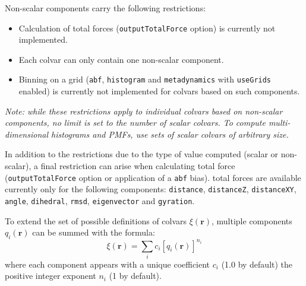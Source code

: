Non-scalar components carry the following restrictions:
\begin{itemize}
\item Calculation of total forces (\texttt{outputTotalForce} option)
  is currently not implemented.
\item Each colvar can only contain one non-scalar component.
\item Binning on a grid (\texttt{abf}, \texttt{histogram} and
  \texttt{metadynamics} with \texttt{useGrids} enabled) is currently
  not implemented for colvars based on such components.
\end{itemize}

\emph{Note: while these restrictions apply to individual colvars based
  on non-scalar components, no limit is set to the number of scalar
  colvars.  To compute multi-dimensional histograms and PMFs, use sets
  of scalar colvars of arbitrary size.}


In addition to the restrictions due to the type of value computed (scalar or non-scalar),
a final restriction can arise when calculating total force
(\texttt{outputTotalForce} option or application of a \texttt{abf}
bias).  total forces are available currently only for the following
components: \texttt{distance}, \texttt{distanceZ},
\texttt{distanceXY}, \texttt{angle}, \texttt{dihedral}, \texttt{rmsd},
\texttt{eigenvector} and \texttt{gyration}.




To extend the set of possible definitions of colvars $\xi(\mathbf{r})$, multiple components
$q_i(\mathbf{r})$ can be summed with the formula:
\begin{equation}
  \label{eq:colvar_combination}
  \xi\left(\mathbf{r}\right) = \sum_i c_i [q_i(\mathbf{r})]^{n_i}
\end{equation}
where each component appears with a unique coefficient $c_i$ (1.0 by
default) the positive integer exponent $n_i$ (1 by default).

